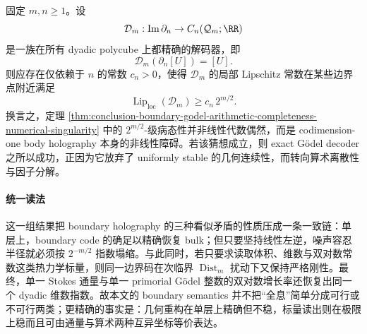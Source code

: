 \begin{conjecture}[非线性全息稳定性同样指数受阻]\label{conj:conclusion-boundary-holography-nonlinear-lipschitz-instability}
固定 \(m,n\ge 1\)。设
\[
\mathcal D_m:\operatorname{Im}\partial_n\to C_n(\mathcal Q_m;\RR)
\]
是一族在所有 dyadic polycube 上都精确的解码器，即
\[
\mathcal D_m(\partial_n[U])=[U].
\]
则应存在仅依赖于 \(n\) 的常数 \(c_n>0\)，使得 \(\mathcal D_m\) 的局部 Lipschitz 常数在某些边界点附近满足
\[
\operatorname{Lip}_{\mathrm{loc}}(\mathcal D_m)\ge c_n\,2^{m/2}.
\]
换言之，定理 \ref{thm:conclusion-boundary-godel-arithmetic-completeness-numerical-singularity} 中的 \(2^{m/2}\)-级病态性并非线性代数偶然，而是 codimension-one body holography 本身的非线性障碍。若该猜想成立，则 exact Gödel decoder 之所以成功，正因为它放弃了 uniformly stable 的几何连续性，而转向算术离散性与因子分解。
\end{conjecture}

\paragraph{统一读法}
这一组结果把 boundary holography 的三种看似矛盾的性质压成一条一致链：单层上，boundary code 的确足以精确恢复 bulk；但只要坚持线性左逆，噪声容忍半径就必须按 \(2^{-m/2}\) 指数塌缩。与此同时，若只要求读取体积、维数与双对数常数这类热力学标量，则同一边界码在次临界 \(\operatorname{Dist}_m\) 扰动下又保持严格刚性。最终，单一 Stokes 通量与单一 primorial Gödel 整数的双对数增长率还恢复出同一个 dyadic 维数指数。故本文的 boundary semantics 并不把“全息”简单分成可行或不可行两类；更精确的事实是：几何重构在单层上精确但不稳，标量读出则在极限上稳而且可由通量与算术两种互异坐标等价表达。

\endinput
